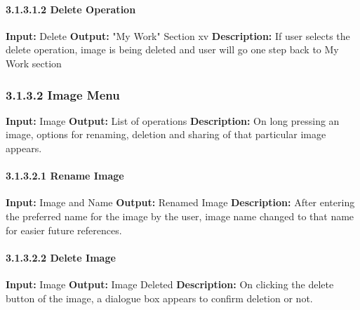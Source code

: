 \documentclass{scrreprt}
\begin{document}
\paragraph{3.1.3.1.2 Delete Operation}
\hfill \vspace{2.5mm} \break 
\textbf{Input:} Delete \newline
\textbf{Output:} "My Work" Section
xv 
\vspace{1mm}\newline
\textbf{Description:} \newline 
If user selects the delete operation, image is being deleted and user will go one step back to My Work section

\subsubsection{3.1.3.2 Image Menu}
\textbf{Input:} Image \newline
\textbf{Output:} List of operations
\vspace{1mm}\newline
\textbf{Description:} \newline 
On long pressing an image, options for renaming, deletion and sharing of that particular image appears.

\paragraph{3.1.3.2.1 Rename Image}
\hfill \vspace{2.5mm} \break 
\textbf{Input:} Image and Name \newline
\textbf{Output:} Renamed Image
\vspace{1mm}\newline
\textbf{Description:} \newline 
After entering the preferred name for the image by the user, image name changed to that name for easier future references.

\paragraph{3.1.3.2.2 Delete Image}
\hfill \vspace{2.5mm} \break 
\textbf{Input:} Image \newline
\textbf{Output:} Image Deleted
\vspace{1mm}\newline
\textbf{Description:} \newline 
On clicking the delete button of the image, a dialogue box appears to confirm deletion or not.
\end{document}
